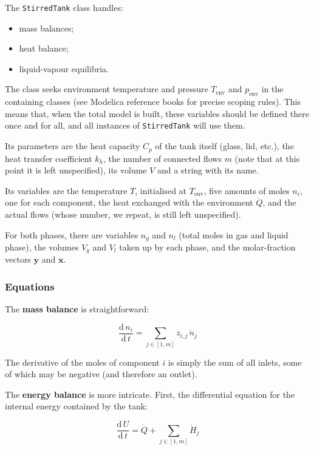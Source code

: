 \documentclass[a4paper]{article}
\renewcommand{\d}{\ensuremath{\mathrm{d}}}
\newcommand{\der}[2]{\ensuremath{\frac{\d \, #1}{\d \, #2}}}
\begin{document}
The \texttt{StirredTank} class handles:
\begin{itemize}
\item mass balances;
\item heat balance;
\item liquid-vapour equilibria.
\end{itemize}

The class seeks environment temperature and pressure $T_\text{env}$ and
$p_\text{env}$ in the containing classes (see Modelica reference books for
precise scoping rules). This means that, when the total model is built, these
variables should be defined there once and for all, and all instances of
\texttt{StirredTank} will use them.

Its parameters are the heat capacity $C_p$ of the tank itself (glass, lid,
etc.), the heat transfer coefficient $k_h$, the number of connected flows $m$
(note that at this point it is left unspecified), its volume $V$ and a string
with its name.

Its variables are the temperature $T$, initialised at $T_\text{env}$, five
amounts of moles $n_i$, one for each component, the heat exchanged with the
environment $\dot Q$, and the actual flows (whose number, we repeat, is still
left unspecified).

For both phases, there are variables $n_g$ and $n_l$ (total moles in gas and
liquid phase), the volumes $V_g$ and $V_l$ taken up by each phase, and the
molar-fraction vectors $\mathbf{y}$ and $\mathbf{x}$.

\subsubsection{Equations}
The \textbf{mass balance} is straightforward:

\begin{equation}
\der{n_i}{t} = \sum_{j \in [1, m]} z_{i,j}\,\dot n_j
\end{equation}

The derivative of the moles of component $i$ is simply the sum of all inlets,
some of which may be negative (and therefore an outlet).

The \textbf{energy balance} is more intricate. First, the differential equation for the
internal energy contained by the tank:

\begin{equation}
\der{U}{t} = \dot Q + \sum_{j \in [1, m]} \dot H_j
\end{equation}
\end{document}
